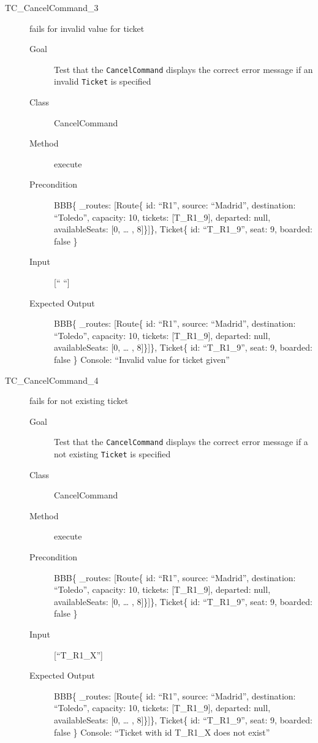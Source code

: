\documentclass[11pt]{article}
\begin{document}
\begin{description}
\item[{TC\_CancelCommand\_3}] fails for invalid value for ticket
\begin{description}
\item[{Goal}] Test that the \texttt{CancelCommand} displays the correct error message if an invalid \texttt{Ticket} is specified
\item[{Class}] CancelCommand
\item[{Method}] execute
\item[{Precondition}] BBB\{ \_routes: [Route\{ id: “R1”, source: “Madrid”, destination: “Toledo”, capacity: 10,  tickets: [T\_R1\_9], departed: null, availableSeats: [0, … , 8]\}]\}, Ticket\{ id: “T\_R1\_9”, seat: 9, boarded: false \}
\item[{Input}] [“ “]
\item[{Expected Output}] BBB\{ \_routes: [Route\{ id: “R1”, source: “Madrid”, destination: “Toledo”, capacity: 10,  tickets: [T\_R1\_9], departed: null, availableSeats: [0, … , 8]\}]\}, Ticket\{ id: “T\_R1\_9”, seat: 9, boarded: false \}
Console: “Invalid value for ticket given”
\end{description}

\item[{TC\_CancelCommand\_4}] fails for not existing ticket
\begin{description}
\item[{Goal}] Test that the \texttt{CancelCommand} displays the correct error message if a not existing \texttt{Ticket} is specified
\item[{Class}] CancelCommand
\item[{Method}] execute
\item[{Precondition}] BBB\{ \_routes: [Route\{ id: “R1”, source: “Madrid”, destination: “Toledo”, capacity: 10,  tickets: [T\_R1\_9], departed: null, availableSeats: [0, … , 8]\}]\}, Ticket\{ id: “T\_R1\_9”, seat: 9, boarded: false \}
\item[{Input}] [“T\_R1\_X”]
\item[{Expected Output}] BBB\{ \_routes: [Route\{ id: “R1”, source: “Madrid”, destination: “Toledo”, capacity: 10,  tickets: [T\_R1\_9], departed: null, availableSeats: [0, … , 8]\}]\}, Ticket\{ id: “T\_R1\_9”, seat: 9, boarded: false \}
Console: “Ticket with id T\_R1\_X does not exist”
\end{description}


\end{description}
\end{document}
